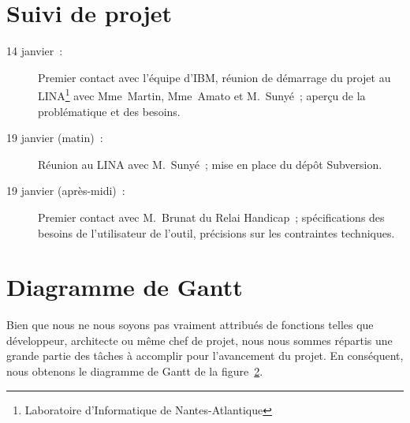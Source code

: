 \appendix

\chapter{Suivi de projet}

\begin{description}
\item[14 janvier~:] Premier contact avec l'équipe d'IBM, réunion de démarrage du projet au LINA\footnote{Laboratoire d'Informatique de Nantes-Atlantique} avec Mme~Martin, Mme~Amato et M.~Sunyé~; aperçu de la problématique et des besoins.
\item[19 janvier (matin)~:] Réunion au LINA avec M.~Sunyé~; mise en place du dépôt Subversion.
\item[19 janvier (après-midi)~:] Premier contact avec M.~Brunat du Relai Handicap~; spécifications des besoins de l'utilisateur de l'outil, précisions sur les contraintes techniques.
\end{description}


\chapter{Diagramme de Gantt}

Bien que nous ne nous soyons pas vraiment attribués de fonctions telles que développeur, architecte ou même chef de projet, nous nous sommes répartis une grande partie des tâches à accomplir pour l'avancement du projet.
En conséquent, nous obtenons le diagramme de Gantt de la figure~\ref{}. %


\printindex
